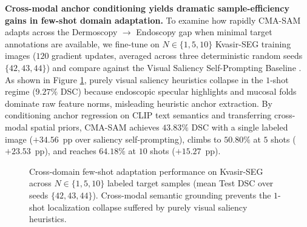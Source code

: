 \documentclass[onecolumn]{IEEEtran}
\numberwithin{equation}{section}
\theoremstyle{definition}
\theoremstyle{remark}
\begin{document}
\textbf{Cross-modal anchor conditioning yields dramatic sample-efficiency gains in few-shot domain adaptation.} To examine how rapidly CMA-SAM adapts across the Dermoscopy $\rightarrow$ Endoscopy gap when minimal target annotations are available, we fine-tune on $N \in \{1, 5, 10\}$ Kvasir-SEG training images ($120$ gradient updates, averaged across three deterministic random seeds $\{42, 43, 44\}$) and compare against the Visual Saliency Self-Prompting Baseline \cite{xie2025self}. As shown in Figure \ref{fig:few_shot_performance}, purely visual saliency heuristics collapse in the $1$-shot regime ($9.27\%$ DSC) because endoscopic specular highlights and mucosal folds dominate raw feature norms, misleading heuristic anchor extraction. By conditioning anchor regression on CLIP text semantics and transferring cross-modal spatial priors, CMA-SAM achieves $43.83\%$ DSC with a single labeled image ($+34.56$~pp over saliency self-prompting), climbs to $50.80\%$ at $5$ shots ($+23.53$~pp), and reaches $64.18\%$ at $10$ shots ($+15.27$~pp).

\begin{figure}[!htbp]
\centering
{}
\caption{Cross-domain few-shot adaptation performance on Kvasir-SEG across $N \in \{1, 5, 10\}$ labeled target samples (mean Test DSC over seeds $\{42, 43, 44\}$). Cross-modal semantic grounding prevents the $1$-shot localization collapse suffered by purely visual saliency heuristics.}
\label{fig:few_shot_performance}
\end{figure}
\end{document}
